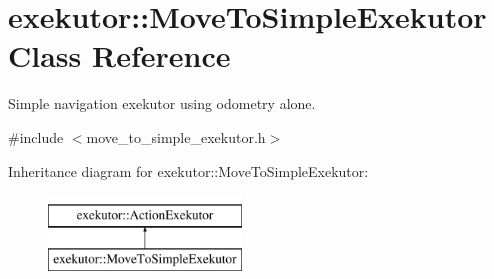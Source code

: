 \hypertarget{classexekutor_1_1MoveToSimpleExekutor}{\section{exekutor\-:\-:\-Move\-To\-Simple\-Exekutor \-Class \-Reference}
\label{classexekutor_1_1MoveToSimpleExekutor}
}


\-Simple navigation exekutor using odometry alone.  




{\ttfamily \#include $<$move\-\_\-to\-\_\-simple\-\_\-exekutor.\-h$>$}

\-Inheritance diagram for exekutor\-:\-:\-Move\-To\-Simple\-Exekutor\-:\begin{figure}[H]
\begin{center}
\leavevmode
\includegraphics[height=2.000000cm]{classexekutor_1_1MoveToSimpleExekutor}
\end{center}
\end{figure}
